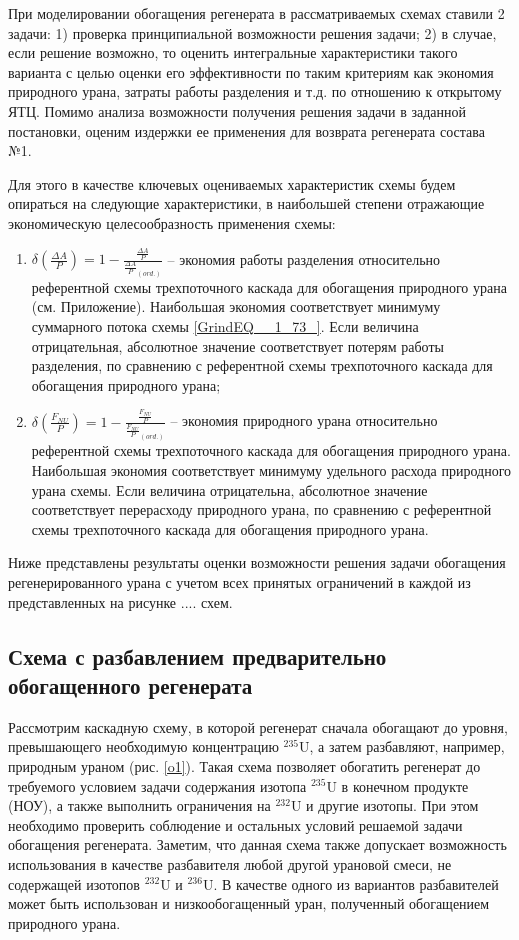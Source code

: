 При моделировании обогащения регенерата в рассматриваемых схемах ставили 2 задачи: 1) проверка принципиальной возможности решения задачи; 2) в случае, если решение возможно, то оценить интегральные характеристики такого варианта с целью оценки его эффективности по таким критериям как экономия природного урана, затраты работы разделения и т.д. по отношению к открытому ЯТЦ. Помимо анализа возможности получения решения задачи в заданной постановки, оценим издержки ее применения для возврата регенерата состава №1. 




Для этого в качестве ключевых оцениваемых характеристик схемы будем опираться на следующие характеристики, в наибольшей степени отражающие экономическую целесообразность применения схемы:
\begin{enumerate}
    \item $\delta(\frac{\Delta A}{P})=1-\frac{\frac{\Delta A}{P}}{{\frac{\Delta A}{P}}_{(ord.)}}$ -- экономия работы разделения относительно референтной схемы трехпоточного каскада для обогащения природного урана (см. Приложение). Наибольшая экономия соответствует минимуму суммарного потока схемы \ref{GrindEQ__1_73_}. Если величина отрицательная, абсолютное значение соответствует потерям работы разделения, по сравнению с референтной схемы трехпоточного каскада для обогащения природного урана;
    \item $\delta(\frac{F_{NU}}{P})=1-\frac{\frac{F_{NU}}{P}}{{\frac{F_{NU}}{P}}_{(ord.)}}$ -- экономия природного урана относительно референтной схемы трехпоточного каскада для обогащения природного урана.  Наибольшая экономия соответствует минимуму удельного расхода природного урана схемы. Если величина отрицательна, абсолютное значение соответствует перерасходу природного урана, по сравнению с референтной схемы трехпоточного каскада для обогащения природного урана.
\end{enumerate}

Ниже представлены результаты оценки возможности решения задачи обогащения регенерированного урана с учетом всех принятых ограничений в каждой из представленных на рисунке ....   схем. 

\subsection{Схема с разбавлением предварительно обогащенного регенерата}

Рассмотрим каскадную схему, в которой регенерат сначала обогащают до уровня, превышающего необходимую концентрацию $^{235}$U, а затем разбавляют, например, природным ураном (рис. \ref{o1}). Такая схема позволяет обогатить регенерат до требуемого условием задачи содержания изотопа $^{235}$U в конечном продукте (НОУ), а также выполнить ограничения на $^{232}$U и другие изотопы. При этом необходимо проверить соблюдение и остальных условий решаемой задачи обогащения регенерата. Заметим, что данная схема также допускает возможность использования в качестве разбавителя любой другой урановой смеси, не содержащей изотопов $^{232}$U и $^{236}$U. В качестве одного из вариантов разбавителей может быть использован и низкообогащенный уран, полученный обогащением природного урана.


